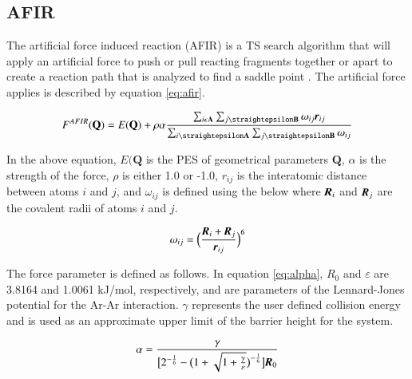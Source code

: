 \documentclass[preprint, 11pt]{elsarticle} %
\begin{document}
\subsection{AFIR}

The artificial force induced reaction (AFIR) is a TS search algorithm that will apply an artificial force to push or pull reacting fragments together or apart to create a reaction path that is analyzed to find a saddle point \cite{Maeda:2016, Madea:2018}. 
The artificial force applies is described by equation \ref{eq:afir}.

\begin{equation}
    F^{AFIR}(\textbf{Q}) = E(\textbf{Q}) + \rho\alpha \frac{\sum_{i\epsilon\textbf{A}} \sum_{j\straightepsilon\textbf{B}} \omega_{ij}\textbf{\textit{r}}_{ij}}{\sum_{i\straightepsilon\textbf{A}} \sum_{j\straightepsilon\textbf{B}} \omega_{ij}}
    \label{eq:afir}
\end{equation}

In the above equation, $E(\textbf{Q}$ is the PES of geometrical parameters $\textbf{Q}$, $\alpha$ is the strength of the force, $\rho$ is either 1.0 or -1.0, $r_{ij}$ is the interatomic distance between atoms $i$ and $j$, and $\omega_{ij}$ is defined using the below where $\textbf{\textit{R}}_i$ and $\textbf{\textit{R}}_j$ are the covalent radii of atoms $i$ and $j$.

\begin{equation}
    \omega_{ij} = \Big( \frac{\textbf{\textit{R}}_i + \textbf{\textit{R}}_j}{\textbf{\textit{r}}_{ij}} \Big)^6
\end{equation}

The force parameter is defined as follows.
In equation \ref{eq:alpha}, $\textit{R}_0$ and $\varepsilon$ are 3.8164 \angstrom and 1.0061 kJ/mol, respectively, and are parameters of the Lennard-Jones potential for the Ar-Ar interaction.
$\gamma$ represents the user defined collision energy and is used as an approximate upper limit of the barrier height for the system. 

\begin{equation}
    \alpha = \frac{\gamma}{\big[2^{-\frac{1}{6}} - \big( 1+ \sqrt{1+ \frac{\gamma}{\varepsilon }} \big)^{-\frac{1}{6}} \big] \textbf{\textit{R}}_0}
    \label{eq:alpha}
\end{equation}
\end{document}
